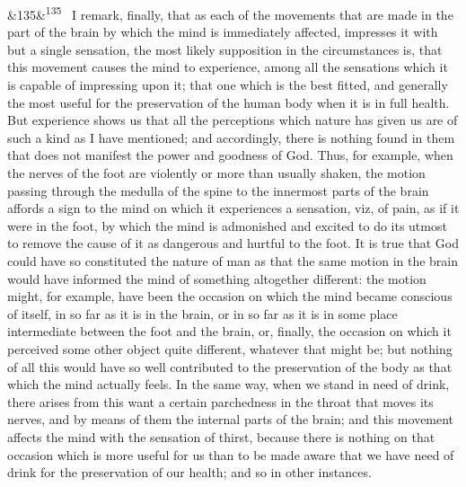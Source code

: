 \documentclass[12pt]{article}
\newcommand{\para}[1][]{\par\noindent\ifx&#1&\else\textsuperscript{\footnotesize #1}~\fi}
\begin{document}
\para[135] I remark, finally, that as each of the movements that are made in the part of the brain by which the mind is immediately affected, impresses it with but a single sensation, the most likely supposition in the circumstances is, that this movement causes the mind to experience, among all the sensations which it is capable of impressing upon it; that one which is the best fitted, and generally the most useful for the preservation of the human body when it is in full health. But experience shows us that all the perceptions which nature has given us are of such a kind as I have mentioned; and accordingly, there is nothing found in them that does not manifest the power and goodness of God. Thus, for example, when the nerves of the foot are violently or more than usually shaken, the motion passing through the medulla of the spine to the innermost parts of the brain affords a sign to the mind on which it experiences a sensation, viz, of pain, as if it were in the foot, by which the mind is admonished and excited to do its utmost to remove the cause of it as dangerous and hurtful to the foot. It is true that God could have so constituted the nature of man as that the same motion in the brain would have informed the mind of something altogether different: the motion might, for example, have been the occasion on which the mind became conscious of itself, in so far as it is in the brain, or in so far as it is in some place intermediate between the foot and the brain, or, finally, the occasion on which it perceived some other object quite different, whatever that might be; but nothing of all this would have so well contributed to the preservation of the body as that which the mind actually feels. In the same way, when we stand in need of drink, there arises from this want a certain parchedness in the throat that moves its nerves, and by means of them the internal parts of the brain; and this movement affects the mind with the sensation of thirst, because there is nothing on that occasion which is more useful for us than to be made aware that we have need of drink for the preservation of our health; and so in other instances.
\end{document}
